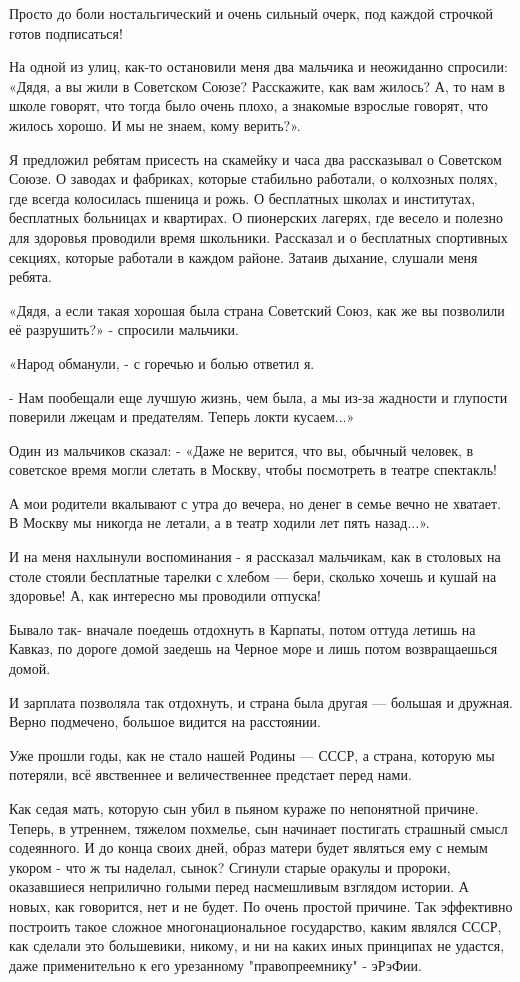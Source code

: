 \documentclass[a4paper,11pt]{extreport}
\begin{document}

Просто до боли ностальгический и очень сильный очерк, под каждой строчкой готов
подписаться!

На одной из улиц, как-то остановили меня два мальчика и неожиданно спросили:
«Дядя, а вы жили в Советском Союзе? Расскажите, как вам жилось? А, то нам в
школе говорят, что тогда было очень плохо, а знакомые взрослые говорят, что
жилось хорошо. И мы не знаем, кому верить?».

Я предложил ребятам присесть на скамейку и часа два рассказывал о Советском
Союзе. О заводах и фабриках, которые стабильно работали, о колхозных полях, где
всегда колосилась пшеница и рожь. О бесплатных школах и институтах, бесплатных
больницах и квартирах.  О пионерских лагерях, где весело и полезно для здоровья
проводили время школьники. Рассказал и о бесплатных спортивных секциях, которые
работали в каждом районе.  Затаив дыхание, слушали меня ребята.

«Дядя, а если такая хорошая была страна Советский Союз, как же вы позволили её
разрушить?» - спросили мальчики.

«Народ обманули, - с горечью и болью ответил я.

- Нам пообещали еще лучшую жизнь, чем была, а мы из-за жадности и глупости
поверили лжецам и предателям. Теперь локти кусаем...»

Один из мальчиков сказал: - «Даже не верится, что вы, обычный человек, в
советское время могли слетать в Москву, чтобы посмотреть в театре спектакль!

А мои родители вкалывают с утра до вечера, но денег в семье вечно не хватает. В
Москву мы никогда не летали, а в театр ходили лет пять назад...».

И на меня нахлынули воспоминания - я рассказал мальчикам, как в столовых на
столе стояли бесплатные тарелки с хлебом --- бери, сколько хочешь и кушай на
здоровье! А, как интересно мы проводили отпуска!

Бывало так- вначале поедешь отдохнуть в Карпаты, потом оттуда летишь на Кавказ,
по дороге домой заедешь на Черное море и лишь потом возвращаешься домой.

И зарплата позволяла так отдохнуть, и страна была другая --- большая и дружная.
Верно подмечено, большое видится на расстоянии.

Уже прошли годы, как не стало нашей Родины --- СССР, а страна, которую мы
потеряли, всё явственнее и величественнее предстает перед нами.

Как седая мать, которую сын убил в пьяном кураже по непонятной причине. Теперь,
в утреннем, тяжелом похмелье, сын начинает постигать страшный смысл содеянного.
И до конца своих дней, образ матери будет являться ему с немым укором - что ж
ты наделал, сынок?  Сгинули старые оракулы и пророки, оказавшиеся неприлично
голыми перед насмешливым взглядом истории. А новых, как говорится, нет и не
будет. По очень простой причине. Так эффективно построить такое сложное
многонациональное государство, каким являлся СССР, как сделали это большевики,
никому, и ни на каких иных принципах не удастся, даже применительно к его
урезанному "правопреемнику" - эРэФии.
\end{document}
